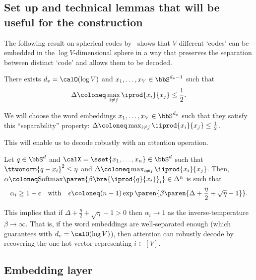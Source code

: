 \subsection*{Set up and technical lemmas that will be useful for the construction}

The following result on spherical codes by~\citet{wyner1965capabilities} shows that $V$ different `codes' can be embedded in the $\log V$-dimensional sphere in a way that preserves the separation between distinct `code' and allows them to be decoded.

\begin{lemma}\label{lemma:wyner}
    There exists $d_v = \calO(\log V)$ and $x_1, \ldots, x_V \in \bbS^{d_v-1}$ such that
    \begin{equation*}
        \Delta \coloneq \max_{i \neq j} \iprod{x_i}{x_j} \leq \frac{1}{2}.
    \end{equation*}
\end{lemma}

We will choose the word embeddings $x_1, \ldots, x_V \in \bbS^{d_v}$ such that they satisfy this ``separability'' property: $\Delta \coloneq \max_{i\neq j} \iiprod{x_i}{x_j} \leq \frac{1}{2}$.

This will enable us to decode robustly with an attention operation.

\begin{lemma}\label{lemma:attn_decadbility}
    Let $q \in \bbS^d$ and $\calX = \sset{x_1, \ldots, x_n} \in \bbS^d$ such that $\ttwonorm{q - x_i}^2 \leq \eta$ and $\Delta \coloneq \max_{i \neq j} \iiprod{x_i}{x_j}$. Then, $\alpha \coloneq \mathrm{Softmax}\paren{\beta \bra{\iprod{q}{x_i}}_i} \in \Delta^n$ is such that 
    \[\alpha_i \geq 1 - \epsilon \quad \text{with} \quad \epsilon \coloneq (n-1) \exp\paren{\beta\paren{\Delta + \frac{\eta}{2} + \sqrt{\eta} - 1}}.\]
\end{lemma}


This implies that if $\Delta + \frac{\eta}{2} + \sqrt{\eta} - 1 > 0$ then $\alpha_i \to 1$ as the inverse-temperature $\beta \to \infty$. That is, if the word embeddings are well-separated enough (which~ guarantees with $d_v = \calO(\log V)$), then attention can robustly decode by recovering the one-hot vector representing $i \in [V]$.

\subsection*{Embedding layer}

